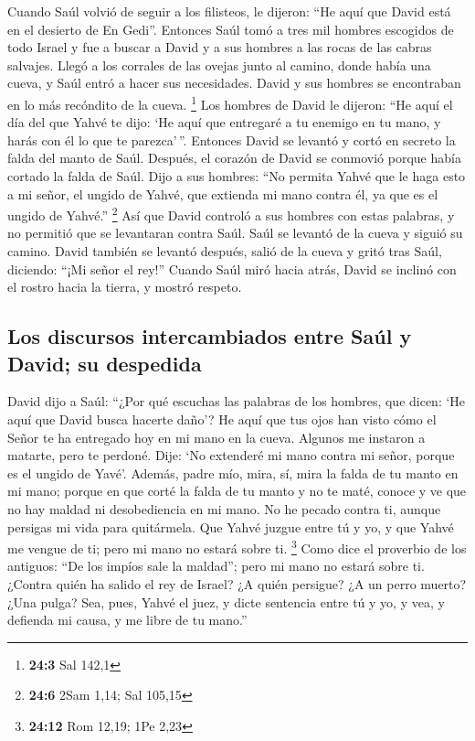\begin{paracol}{2}
 Cuando Saúl volvió de seguir a los filisteos, le dijeron:
``He aquí que David está en el desierto de En Gedi''. 
Entonces Saúl tomó a tres mil hombres escogidos de todo Israel y fue a
buscar a David y a sus hombres a las rocas de las cabras salvajes.
 Llegó a los corrales de las ovejas junto al camino, donde
había una cueva, y Saúl entró a hacer sus necesidades. David y sus
hombres se encontraban en lo más recóndito de la cueva. \footnote{\textbf{24:3}
  Sal 142,1}  Los hombres de David le dijeron: ``He aquí
el día del que Yahvé te dijo: `He aquí que entregaré a tu enemigo en tu
mano, y harás con él lo que te parezca'\,''. Entonces David se levantó y
cortó en secreto la falda del manto de Saúl.  Después, el
corazón de David se conmovió porque había cortado la falda de Saúl.
 Dijo a sus hombres: ``No permita Yahvé que le haga esto a
mi señor, el ungido de Yahvé, que extienda mi mano contra él, ya que es
el ungido de Yahvé.'' \footnote{\textbf{24:6} 2Sam 1,14; Sal 105,15}
 Así que David controló a sus hombres con estas palabras,
y no permitió que se levantaran contra Saúl. Saúl se levantó de la cueva
y siguió su camino.  David también se levantó después,
salió de la cueva y gritó tras Saúl, diciendo: ``¡Mi señor el rey!''
Cuando Saúl miró hacia atrás, David se inclinó con el rostro hacia la
tierra, y mostró respeto.

\hypertarget{los-discursos-intercambiados-entre-sauxfal-y-david-su-despedida}{%
\subsection{Los discursos intercambiados entre Saúl y David; su
despedida}\label{los-discursos-intercambiados-entre-sauxfal-y-david-su-despedida}}

 David dijo a Saúl: ``¿Por qué escuchas las palabras de
los hombres, que dicen: `He aquí que David busca hacerte daño'?
 He aquí que tus ojos han visto cómo el Señor te ha
entregado hoy en mi mano en la cueva. Algunos me instaron a matarte,
pero te perdoné. Dije: `No extenderé mi mano contra mi señor, porque es
el ungido de Yavé'.  Además, padre mío, mira, sí, mira la
falda de tu manto en mi mano; porque en que corté la falda de tu manto y
no te maté, conoce y ve que no hay maldad ni desobediencia en mi mano.
No he pecado contra ti, aunque persigas mi vida para quitármela.
 Que Yahvé juzgue entre tú y yo, y que Yahvé me vengue de
ti; pero mi mano no estará sobre ti. \footnote{\textbf{24:12} Rom 12,19;
  1Pe 2,23}  Como dice el proverbio de los antiguos: ``De
los impíos sale la maldad''; pero mi mano no estará sobre ti.
 ¿Contra quién ha salido el rey de Israel? ¿A quién
persigue? ¿A un perro muerto? ¿Una pulga?  Sea, pues,
Yahvé el juez, y dicte sentencia entre tú y yo, y vea, y defienda mi
causa, y me libre de tu mano.''


\end{paracol}
